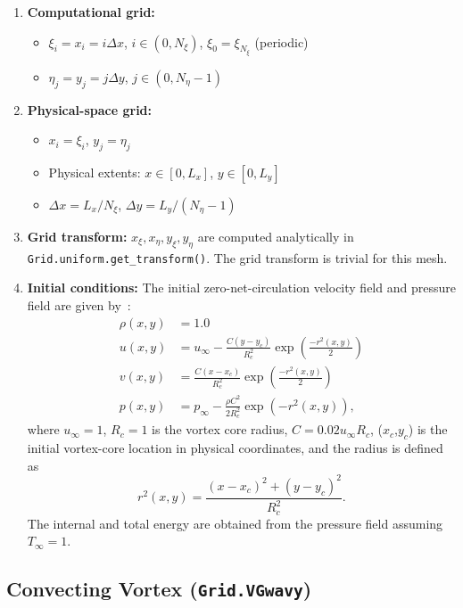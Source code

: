 \documentclass[letterpaper,10pt]{article}
\begin{document}
\begin{enumerate}
\item \textbf{Computational grid:}
  \begin{itemize}
  \item $\xi_i = x_i = i\Delta x$, $i\in(0,N_\xi)$, $\xi_0=\xi_{N_\xi}$ (periodic)
  \item $\eta_j = y_j = j\Delta y$, $j\in(0,N_\eta-1)$
  \end{itemize}

\item \textbf{Physical-space grid:}
  \begin{itemize}
  \item $x_{i} = \xi_i$, $y_{j} = \eta_j$
  \item Physical extents: $x\in[0,L_x]$, $y\in[0,L_y]$
  \item $\Delta x=L_x/N_\xi$, $\Delta y=L_y/(N_\eta-1)$
  \end{itemize}

\item \textbf{Grid transform:} $x_\xi,x_\eta,y_\xi,y_\eta$ are computed analytically in \texttt{Grid.uniform.get\_transform()}. The grid transform is trivial for this mesh.

\item \textbf{Initial conditions:}
  The initial zero-net-circulation velocity field and pressure field are given by~\cite{Poinsot1992}:
  \begin{align*}
    \rho(x,y) &= 1.0 \\
    u(x,y) &= u_\infty - \frac{C(y-y_c)}{R_c^2}\exp\left(\frac{-r^2(x,y)}{2}\right) \\
    v(x,y) &= \frac{C(x-x_c)}{R_c^2}\exp\left(\frac{-r^2(x,y)}{2}\right) \\
    p(x,y) &= p_\infty - \frac{\rho C^2}{2 R_c^2}\exp(-r^2(x,y)),
  \end{align*}
  where $u_\infty=1$, $R_c=1$ is the vortex core radius, $C=0.02u_\infty R_c$, ($x_c$,$y_c$) is the initial vortex-core location in physical coordinates, and the radius is defined as
  \begin{equation*}
    r^2(x,y) = \frac{(x-x_c)^2 + (y-y_c)^2}{R_c^2}.
  \end{equation*}
  The internal and total energy are obtained from the pressure field assuming $T_\infty=1$.
  
\end{enumerate}


\subsection{Convecting Vortex (\texttt{Grid.VGwavy})}
\end{document}

